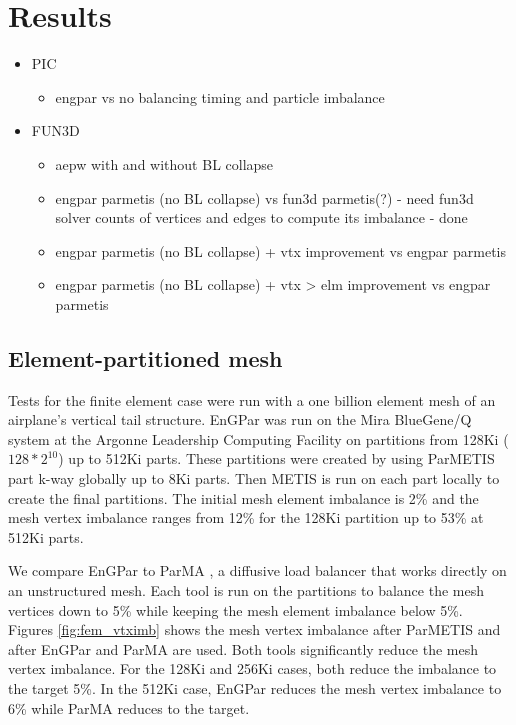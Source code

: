 \documentclass[conference]{IEEEtran}
\begin{document}
\section{Results}
\begin{itemize}
\item PIC
\begin{itemize}
  \item engpar vs no balancing timing and particle imbalance
\end{itemize}
\item FUN3D
\begin{itemize}
  \item aepw with and without BL collapse
  \item engpar parmetis (no BL collapse) vs fun3d parmetis(?) - need fun3d 
    solver counts of vertices and edges to compute its imbalance - done
  \item engpar parmetis (no BL collapse) + vtx improvement vs engpar parmetis
  \item engpar parmetis (no BL collapse) + vtx > elm improvement vs engpar parmetis
\end{itemize}
\end{itemize}

\subsection{Element-partitioned mesh}

Tests for the finite element case were run with a one billion element mesh of an airplane's
vertical tail structure. EnGPar was run on the Mira BlueGene/Q system at the Argonne Leadership
Computing Facility \cite{haring2012ibm} on partitions from 128Ki ($128*2^{10}$) up to 512Ki parts.
These partitions were created by using ParMETIS part k-way \cite{karypis1999parallel} globally
up to 8Ki parts. Then METIS is run on each part locally to create the final partitions.
The initial mesh element imbalance is 2\% and the mesh vertex imbalance ranges from 12\% for
the 128Ki partition up to 53\% at 512Ki parts.

We compare EnGPar to ParMA \cite{SmithParma2015}, a diffusive load balancer that
works directly on an unstructured mesh.
Each tool is run on the partitions to balance the mesh vertices down to 5\% while keeping the mesh
element imbalance below 5\%. Figures \ref{fig:fem_vtximb} shows the mesh vertex imbalance after
ParMETIS and after EnGPar and ParMA are used. Both tools significantly reduce the mesh vertex
imbalance. For the 128Ki and 256Ki cases, both reduce the imbalance to the target 5\%. In
the 512Ki case, EnGPar reduces the mesh vertex imbalance to 6\% while ParMA reduces to the
target.
\end{document}
